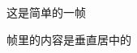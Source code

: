 \documentclass{beamer}
\begin{document}
\begin{frame}
    这是简单的一帧

    帧里的内容是垂直居中的
\end{frame}
\end{document}
